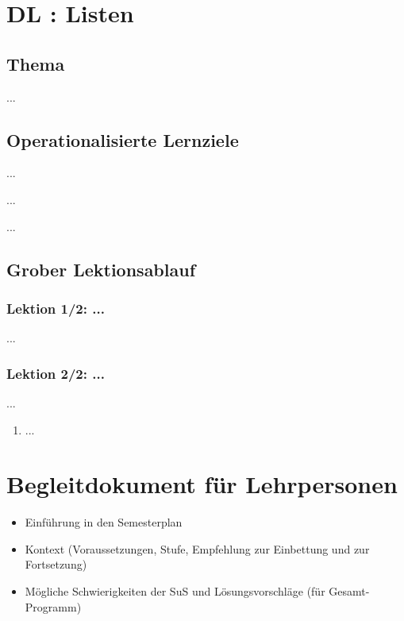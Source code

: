 \section{DL \themycounter: Listen}
\begin{myExBox}[title=DL \themycounter]
\subsection*{Thema}
...


\subsection*{Operationalisierte Lernziele}
\begin{todolist}
    \item ...
    \item ...
    \item ...
\end{todolist}

\subsection*{Grober Lektionsablauf}
\subsubsection*{Lektion 1/2: ...}
...

\subsubsection*{Lektion 2/2: ...}
...

\begin{myExBox}[title=Mögliche Schwierigkeiten \& geeignete Massnahmen]
\begin{enumerate}
    \item ...
\end{enumerate}
\end{myExBox}
\end{myExBox}
\newpage{}


\section{Begleitdokument für Lehrpersonen}
\begin{itemize}
    \item Einführung in den Semesterplan
    \item Kontext (Voraussetzungen, Stufe, Empfehlung zur Einbettung und zur Fortsetzung)
    \item Mögliche Schwierigkeiten der SuS und Lösungsvorschläge (für Gesamt-Programm)
\end{itemize}